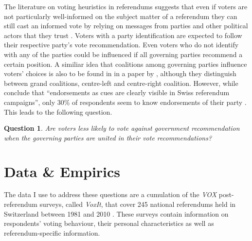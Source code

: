 \documentclass[11pt,a4paper]{article}\usepackage[]{graphicx}\usepackage[]{color}
\newtheorem{question}{Question}
\begin{document}
    The literature on voting heuristics in referendums suggests that even if voters are not particularly well-informed on the subject matter of a referendum they can still cast an informed vote by relying on messages from parties and other political actors that they trust \citep{lupia_shortcuts_1994}.   
    Voters with a party identification are expected to follow their respective party's vote recommendation. Even voters who do not identify with any of the parties could be influenced if all governing parties recommend a certain position. A similiar 
    idea that coalitions among governing parties influence voters' choices is also to be found in in a paper by \citet{sciarini_campaign_2011}, although they distinguish between grand coalitions, centre-left and centre-right coalition. However, while \citet[766]{christin_interests_2002} conclude that ``endorsements as cues are clearly visible in Swiss referendum campaigns'', only 30\% of respondents seem to know endorsements of their party \citep{gruner_stimmburger_1983}. This leads to the following question. 
    	
     \begin{question}
    	\begin{minipage}[t]{4 in}
    	Are voters less likely to vote against government recommendation when the governing parties are united in their vote recommendations?
      \end{minipage}
     \end{question}
    
    
    
    \section{Data \& Empirics}\label{sec:data}
    
    The data I use to address these questions are a cumulation of the \textit{VOX} post-referendum surveys, called \textit{VoxIt}, that cover 245 national referendums held in Switzerland between 1981 and 2010 \citep{brunner_voxit_nD}. These surveys contain information on respondents’ voting behaviour, their personal characteristics as well as referendum-specific information.
    
\end{document}
